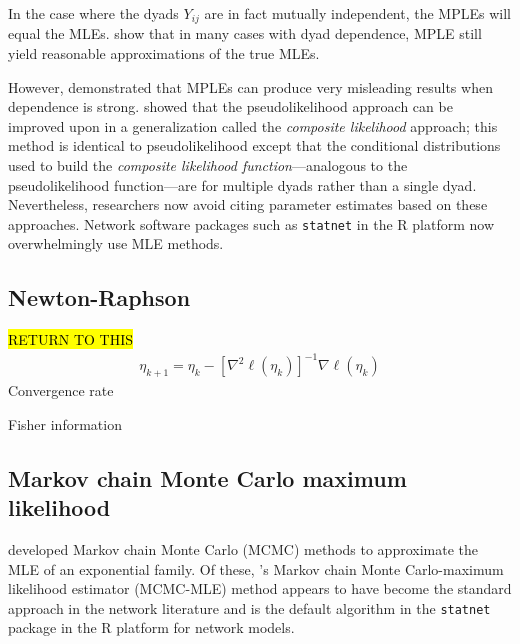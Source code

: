 In the case where the dyads $Y_{ij}$ are in fact mutually independent, the MPLEs will equal the MLEs.  
\citet{Strauss:1990} show that in 
many cases with dyad dependence, MPLE still yield reasonable approximations of the 
true MLEs.  

However, \citet*{Geyer:1992, Snijders:2002, Duijn:2009} demonstrated that 
MPLEs can produce very misleading results when dependence is strong.  
\citet*{Composite} showed that the pseudolikelihood approach can be 
improved upon in a generalization 
called the \emph{composite likelihood} approach; this method is identical
to pseudolikelihood except that the conditional distributions used to build the \emph{composite likelihood function}---analogous to the pseudolikelihood function---are for multiple dyads rather than a single dyad.
Nevertheless, researchers now avoid citing parameter estimates based on these approaches.
Network software packages such as \texttt{statnet} \citep*{statnet:R} in the R 
platform now overwhelmingly use MLE methods.  


\subsection{Newton-Raphson}
\hl{RETURN TO THIS}
\begin{align}
	\eta_{k+1} = \eta_k - \left[ \nabla^2 \ell(\eta_k) \right ]^{-1} \nabla \ell(\eta_k) 	
\end{align}
Convergence rate

Fisher information

\subsection{Markov chain Monte Carlo maximum likelihood} \label{S:MCMC-MLE}
\citet{Geyer:1992, Corander:1998, Snijders:2002} developed Markov chain Monte Carlo 
(MCMC) methods to approximate the MLE of an exponential family.  Of these, \citeauthor
{Geyer:1992}'s Markov chain Monte Carlo-maximum likelihood estimator (MCMC-MLE) method 
appears to have become the standard approach in the network literature 
\citep{Hunter:2006, Handcock:2006, GOF} and is the default algorithm in 
the \texttt{statnet} package \citep{statnet:R} in the R platform for network models.  

